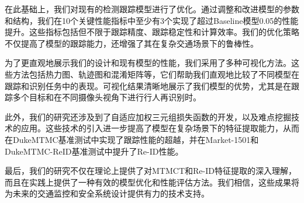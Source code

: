 \begin{abstractzh}
	
\indent 在此基础上，我们对现有的检测跟踪模型进行了优化。通过调整和改进模型的参数和结构，我们在10个关键性能指标中至少有3个实现了超过Baseline模型0.05的性能提升。这些指标包括但不限于跟踪精度、跟踪稳定性和计算效率。我们的优化策略不仅提高了模型的跟踪能力，还增强了其在复杂交通场景下的鲁棒性。

\indent 为了更直观地展示我们的设计和现有模型的性能，我们采用了多种可视化方法。这些方法包括热力图、轨迹图和混淆矩阵等，它们帮助我们直观地比较了不同模型在跟踪和识别任务中的表现。可视化结果清晰地展示了我们模型的优势，尤其是在跟踪多个目标和在不同摄像头视角下进行行人再识别时。

\indent 此外，我们的研究还涉及到了自适应加权三元组损失函数的开发，以及难点挖掘技术的应用。这些技术的引入进一步提高了模型在复杂场景下的特征提取能力，从而在DukeMTMC基准测试中实现了跟踪性能的超越，并在Market-1501和DukeMTMC-ReID基准测试中提升了Re-ID性能。

\indent 最后，我们的研究不仅在理论上提供了对MTMCT和Re-ID特征提取的深入理解，而且在实践上提供了一种有效的模型优化和性能评估方法。我们相信，这些成果将为未来的交通监控和安全系统设计提供有力的技术支持。



\end{abstractzh}